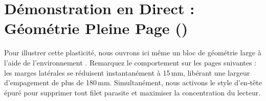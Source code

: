 \section{Démonstration en Direct : Géométrie Pleine Page ()}
\label{sec:demo-geometrie-large}

Pour illustrer cette plasticité, nous ouvrons ici même un bloc de géométrie large
à l'aide de l'environnement .
Remarquez le comportement sur les pages suivantes :
les marges latérales se réduisent instantanément à 15\,mm,
libérant une largeur d'empagement de plus de 180\,mm.
Simultanément, nous activons le style d'en-tête épuré 
pour supprimer tout filet parasite et maximiser la concentration du lecteur.

